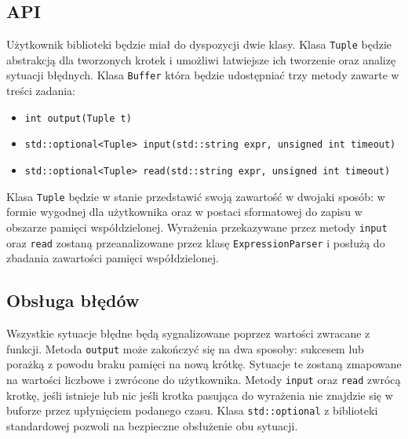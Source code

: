 \documentclass{article}
\begin{document}
	\subsection{API}
	Użytkownik biblioteki będzie miał do dyspozycji dwie klasy. Klasa \texttt{Tuple} będzie abstrakcją dla tworzonych krotek i umożliwi łatwiejsze ich tworzenie oraz analizę sytuacji błędnych. Klasa \texttt{Buffer} która będzie udostępniać trzy metody zawarte w treści zadania:
	\begin{itemize}
		\item \texttt{int output(Tuple t) }
		\item \texttt{std::optional<Tuple> input(std::string expr, unsigned int timeout)}
		\item \texttt{std::optional<Tuple> read(std::string expr, unsigned int timeout)}
	\end{itemize}
	Klasa \texttt{Tuple} będzie w stanie przedstawić swoją zawartość w dwojaki sposób: w formie wygodnej dla użytkownika oraz w postaci sformatowej do zapisu w obszarze pamięci współdzielonej. 
	Wyrażenia przekazywane przez metody \texttt{input} oraz \texttt{read} zostaną przeanalizowane przez klasę \texttt{ExpressionParser} i posłużą do zbadania zawartości pamięci współdzielonej.
	
	\subsection{Obsługa błędów}
	Wszystkie sytuacje błędne będą sygnalizowane poprzez wartości zwracane z funkcji.
	Metoda \texttt{output} może zakończyć się na dwa sposoby: sukcesem lub porażką z powodu braku pamięci na nową krótkę. Sytuacje te zostaną zmapowane na wartości liczbowe i zwrócone do użytkownika.
	Metody \texttt{input} oraz \texttt{read} zwrócą krotkę, jeśli istnieje lub nic jeśli krotka pasująca do wyrażenia nie znajdzie się w buforze przez upłynięciem podanego czasu. Klasa \texttt{std::optional} z biblioteki standardowej pozwoli na bezpieczne obsłużenie obu sytuacji.
	
	
	
\end{document}
